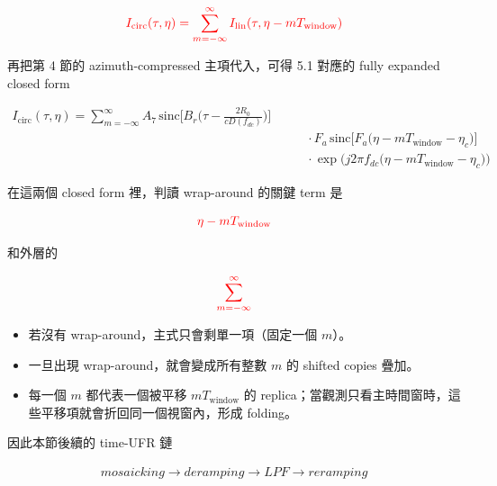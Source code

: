 \documentclass[11pt]{article}
\providecommand{\tightlist}{%
  \setlength{\itemsep}{0pt}\setlength{\parskip}{0pt}}
\begin{document}
\begin{equation}
\begin{aligned} {\color{red}{I_{\mathrm{circ}}(\tau,\eta) = \sum_{m=-\infty}^{\infty} I_{\mathrm{lin}}(\tau,\eta-mT_{\mathrm{window}})}} \end{aligned}
\end{equation}

再把第 4 節的 azimuth-compressed 主項代入，可得 5.1 對應的 fully
expanded closed form

\begin{equation}
\begin{aligned}
I_{\mathrm{circ}}(\tau,\eta)=
\sum_{m=-\infty}^{\infty}
A_7\,
\mathrm{sinc}\biggl[ B_r\biggl( \tau-\frac{2R_0}{cD(f_{dc})} \biggr) \biggr]\\
&\qquad \cdot
F_a\,\mathrm{sinc}\biggl[ F_a\bigl(\eta-mT_{\mathrm{window}}-\eta_c\bigr) \biggr]\\
&\qquad \cdot
\exp\biggl( j2\pi f_{dc}\bigl(\eta-mT_{\mathrm{window}}-\eta_c\bigr) \biggr)
\end{aligned}
\end{equation}

在這兩個 closed form 裡，判讀 wrap-around 的關鍵 term 是

\begin{equation}
\begin{aligned} {\color{red}{\eta-mT_{\mathrm{window}}}} \end{aligned}
\end{equation}

和外層的

\begin{equation}
\begin{aligned} {\color{red}{\sum_{m=-\infty}^{\infty}}} \end{aligned}
\end{equation}

\begin{itemize}
\tightlist
\item
  若沒有 wrap-around，主式只會剩單一項（固定一個 \(m\)）。
\item
  一旦出現 wrap-around，就會變成所有整數 \(m\) 的 shifted copies 疊加。
\item
  每一個 \(m\) 都代表一個被平移 \(mT_{\mathrm{window}}\) 的
  replica；當觀測只看主時間窗時，這些平移項就會折回同一個視窗內，形成
  folding。
\end{itemize}

因此本節後續的 time-UFR 鏈

\begin{equation}
\begin{aligned} mosaicking \rightarrow deramping \rightarrow LPF \rightarrow reramping \end{aligned}
\end{equation}
\end{document}
